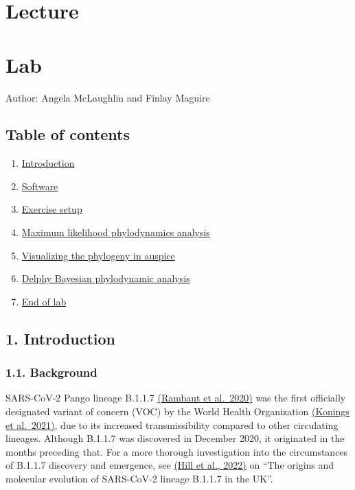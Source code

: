 \documentclass[
]{book}
\providecommand{\tightlist}{%
  \setlength{\itemsep}{0pt}\setlength{\parskip}{0pt}}
\begin{document}
\section{Lecture}\label{lecture-4}

\section{Lab}\label{lab-4}

Author: Angela McLaughlin and Finlay Maguire

\subsection{Table of contents}\label{table-of-contents}

\begin{enumerate}
\def\labelenumi{\arabic{enumi}.}
\tightlist
\item
  \hyperref[intro-mod5]{Introduction}
\item
  \hyperref[software-mod5]{Software}\\
\item
  \hyperref[setup-mod5]{Exercise setup}
\item
  \hyperref[phylodyn-mod5]{Maximum likelihood phylodynamics analysis}
\item
  \hyperref[visualize-tree-mod5]{Visualizing the phylogeny in auspice}
\item
  \hyperref[delphy-mod5]{Delphy Bayesian phylodynamic analysis}
\item
  \hyperref[end-mod5]{End of lab}
\end{enumerate}

\subsection{1. Introduction}\label{introduction-1}

\subsubsection{1.1. Background}\label{background}

SARS-CoV-2 Pango lineage B.1.1.7 \href{https://www.nature.com/articles/s41564-020-0770-5}{(Rambaut et al.~2020)} was the first officially designated variant of concern (VOC) by the World Health Organization \href{https://www.nature.com/articles/s41564-021-00932-w}{(Konings et al.~2021)}, due to its increased transmissibility compared to other circulating lineages. Although B.1.1.7 was discovered in December 2020, it originated in the months preceding that. For a more thorough investigation into the circumstances of B.1.1.7 discovery and emergence, see \href{https://academic.oup.com/ve/article/8/2/veac080/6677185}{(Hill et al., 2022)} on ``The origins and molecular evolution of SARS-CoV-2 lineage B.1.1.7 in the UK''.
\end{document}

